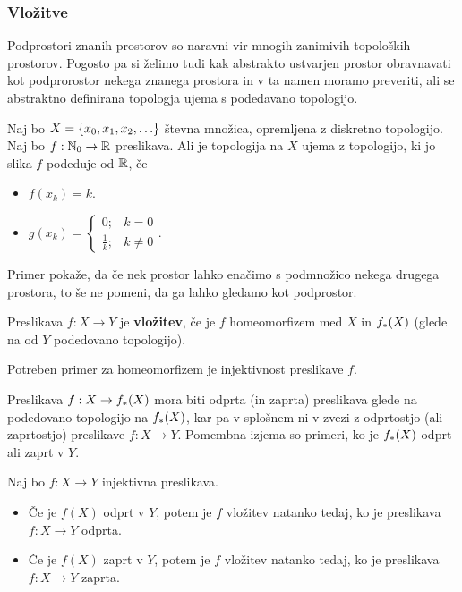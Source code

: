 \subsubsection{Vložitve}
Podprostori znanih prostorov so naravni vir mnogih zanimivih topoloških prostorov. Pogosto pa si želimo tudi kak abstrakto ustvarjen prostor obravnavati kot podprorostor nekega znanega prostora in v ta namen moramo preveriti, ali se abstraktno definirana topologja ujema s podedavano topologijo.

\begin{primer}
    Naj bo $X = \{x_0, x_1, x_2, \ldots\}$ števna množica, opremljena z diskretno topologijo. Naj bo $f: \mathbb{N}_0 \to \mathbb{R}$ preslikava. Ali je topologija na $X$ ujema z topologijo, ki jo slika $f$ podeduje od $\mathbb{R}$, če
    \begin{itemize}
        \item $f(x_k) = k$.
        \item $g(x_k) = \begin{cases}
            0; &k = 0 \\ \frac{1}{k}; & k \neq 0
        \end{cases}.$
    \end{itemize}
\end{primer}

\begin{opomba}
    Primer pokaže, da če nek prostor lahko enačimo s podmnožico nekega drugega prostora, to še ne pomeni, da ga lahko gledamo kot podprostor.
\end{opomba}

\begin{definicija}
    Preslikava $f: X \to Y$ je \textbf{vložitev}, če je $f$ homeomorfizem med $X$ in $f_{*}(X)$ (glede na od $Y$ podedovano topologijo).
\end{definicija}

\begin{opomba}
    Potreben primer za homeomorfizem je injektivnost preslikave $f$. 
\end{opomba}

Preslikava $f: X \to f_{*}(X)$ mora biti odprta (in zaprta) preslikava glede na podedovano topologijo na $f_{*}(X)$, kar pa v splošnem ni v zvezi z odprtostjo (ali zaprtostjo) preslikave $f: X \to Y$. Pomembna izjema so primeri, ko je $f_{*}(X)$ odprt ali zaprt v $Y$.

\begin{trditev}
    Naj bo $f: X \to Y$ injektivna preslikava.
    \begin{itemize}
        \item Če je $f(X)$ odprt v $Y$, potem je $f$ vložitev natanko tedaj, ko je preslikava $f: X \to Y$ odprta.
        \item Če je $f(X)$ zaprt v $Y$, potem je $f$ vložitev natanko tedaj, ko je preslikava $f: X \to Y$ zaprta.
    \end{itemize}
\end{trditev}

